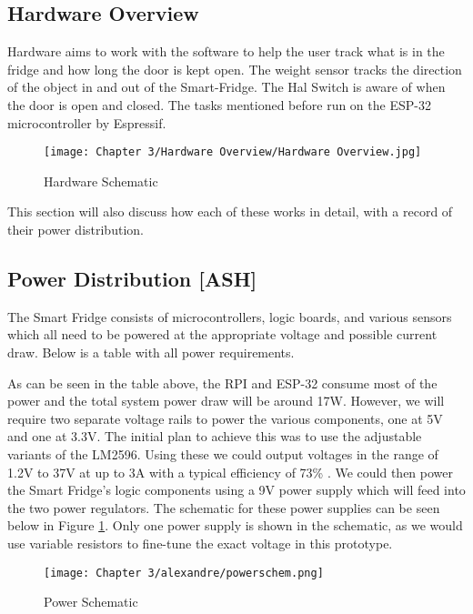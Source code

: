 \subsection{Hardware Overview}

Hardware aims to work with the software to help the user track what is in the fridge and how long the door is kept open.
The weight sensor tracks the direction of the object in and out of the Smart-Fridge.
The Hal Switch is aware of when the door is open and closed.
The tasks mentioned before run on the ESP-32 microcontroller by Espressif.


\begin{figure}[H]        
    \centering
    \texttt{[image: Chapter 3/Hardware Overview/Hardware Overview.jpg]}
    \caption{Hardware Schematic}
\end{figure} 

This section will also discuss how each of these works in detail, with a record of their power distribution.


\subsection{Power Distribution [ASH]}

The Smart Fridge consists of microcontrollers, logic boards, and various sensors which all need to be powered at the appropriate voltage and possible current draw.
Below is a table with all power requirements.



As can be seen in the table above, the RPI and ESP-32 consume most of the power and the total system power draw will be around 17W.
However, we will require two separate voltage rails to power the various components, one at 5V and one at 3.3V.
The initial plan to achieve this was to use the adjustable variants of the LM2596.
Using these we could output voltages in the range of 1.2V to 37V at up to 3A with a typical efficiency of 73\% \cite{tidatasheet}.
We could then power the Smart Fridge's logic components using a 9V power supply which will feed into the two power regulators.
The schematic for these power supplies can be seen below in Figure \ref{fig:powerschem}.
Only one power supply is shown in the schematic, as we would use variable resistors to fine-tune the exact voltage in this prototype.

\begin{figure}[H]        
    \centering
    \texttt{[image: Chapter 3/alexandre/powerschem.png]}
    \caption{Power Schematic}
    \label{fig:powerschem}
\end{figure} 

